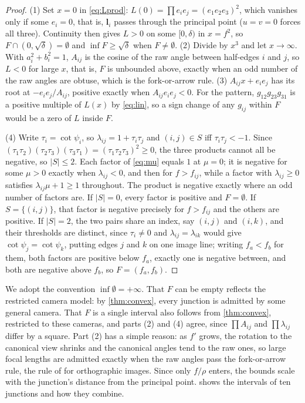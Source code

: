 \documentclass[pdflatex,sn-mathphys-num,iicol]{sn-jnl}
\newcommand{\vl}{\mathbf{l}}
\theoremstyle{thmstyleone}
\theoremstyle{thmstylethree}
\theoremstyle{thmstyletwo}
\begin{document}
\begin{proof}
(1) Set $x=0$ in \eqref{eq:Lprod}: $L(0)=\prod e_ie_j=(e_1e_2e_3)^2$, which vanishes only if some $e_i=0$, that is, $\vl_i$ passes through the principal point ($u=v=0$ forces all three). Continuity then gives $L>0$ on some $[0,\delta)$ in $x=f^2$, so $F\cap(0,\sqrt\delta)=\emptyset$ and $\inf F\ge\sqrt\delta$ when $F\neq\emptyset$. (2) Divide by $x^3$ and let $x\to\infty$. With $a_i^2+b_i^2=1$, $A_{ij}$ is the cosine of the raw angle between half-edges $i$ and $j$, so $L<0$ for large $x$, that is, $F$ is unbounded above, exactly when an odd number of the raw angles are obtuse, which is the fork-or-arrow rule. (3) $A_{ij}x+e_ie_j$ has its root at $-e_ie_j/A_{ij}$, positive exactly when $A_{ij}e_ie_j<0$. For the pattern, $g_{12}g_{23}g_{31}$ is a positive multiple of $L(x)$ by \eqref{eq:lin}, so a sign change of any $g_{ij}$ within $F$ would be a zero of $L$ inside $F$.

(4) Write $\tau_i=\cot\psi_i$, so $\lambda_{ij}=1+\tau_i\tau_j$ and $(i,j)\in S$ iff $\tau_i\tau_j<-1$. Since $(\tau_1\tau_2)(\tau_2\tau_3)(\tau_3\tau_1)=(\tau_1\tau_2\tau_3)^2\ge0$, the three products cannot all be negative, so $|S|\le2$. Each factor of \eqref{eq:mu} equals $1$ at $\mu=0$; it is negative for some $\mu>0$ exactly when $\lambda_{ij}<0$, and then for $f>f_{ij}$, while a factor with $\lambda_{ij}\ge0$ satisfies $\lambda_{ij}\mu+1\ge1$ throughout. The product is negative exactly where an odd number of factors are. If $|S|=0$, every factor is positive and $F=\emptyset$. If $S=\{(i,j)\}$, that factor is negative precisely for $f>f_{ij}$ and the others are positive. If $|S|=2$, the two pairs share an index, say $(i,j)$ and $(i,k)$, and their thresholds are distinct, since $\tau_i\neq0$ and $\lambda_{ij}=\lambda_{ik}$ would give $\cot\psi_j=\cot\psi_k$, putting edges $j$ and $k$ on one image line; writing $f_a<f_b$ for them, both factors are positive below $f_a$, exactly one is negative between, and both are negative above $f_b$, so $F=(f_a,f_b)$.
\end{proof}

We adopt the convention $\inf\emptyset=+\infty$. That $F$ can be empty reflects the restricted camera model: by \cref{thm:convex}, every junction is admitted by some general camera. That $F$ is a single interval also follows from \cref{thm:convex}, restricted to these cameras, and parts (2) and (4) agree, since $\prod A_{ij}$ and $\prod\lambda_{ij}$ differ by a square. Part (2) has a simple reason: as $f'$ grows, the rotation to the canonical view shrinks and the canonical angles tend to the raw ones, so large focal lengths are admitted exactly when the raw angles pass the fork-or-arrow rule, the rule of \citet{kanatani1986} for orthographic images. Since only $f/\rho$ enters, the bounds scale with the junction's distance from the principal point.  shows the intervals of ten junctions and how they combine.
\end{document}
